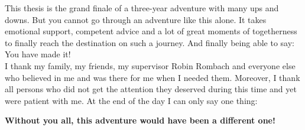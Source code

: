 This thesis is the grand finale of a three-year adventure with many ups and downs. But you cannot go through an adventure like this alone. It takes emotional support, competent advice and a lot of great moments of togetherness to finally reach the destination on such a journey. And finally being able to say: You have made it!
\\

\noindent I thank my family, my friends, my supervisor Robin Rombach and everyone else who believed in me and was there for me when I needed them. Moreover, I thank all persons who did not get the attention they deserved during this time and yet were patient with me. At the end of the day I can only say one thing:
\begin{center}
    \textbf{Without you all, this adventure would have been a different one!}
\end{center}